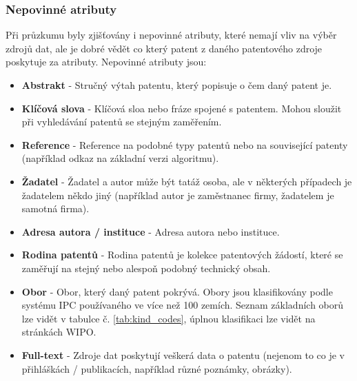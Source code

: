 \subsubsection{Nepovinné atributy}
Při průzkumu byly zjišťovány i nepovinné atributy, které nemají vliv na výběr zdrojů dat, ale je dobré vědět co který patent z daného patentového zdroje poskytuje za atributy. Nepovinné atributy jsou:
\begin{itemize}
\item \textbf{Abstrakt} - Stručný výtah patentu, který popisuje o čem daný patent je.
\item \textbf{Klíčová slova} - Klíčová sloa nebo fráze spojené s patentem. Mohou sloužit při vyhledávání patentů se stejným zaměřením.
\item \textbf{Reference} - Reference na podobné typy patentů nebo na související patenty (například odkaz na základní verzi algoritmu).
\item \textbf{Žadatel} - Žadatel a autor může být tatáž osoba, ale v některých případech je žadatelem někdo jiný (například autor je zaměstnanec firmy, žadatelem je samotná firma).
\item \textbf{Adresa autora / instituce} - Adresa autora nebo instituce.
\item \textbf{Rodina patentů} - Rodina patentů je kolekce patentových žádostí, které se zaměřují na stejný nebo alespoň podobný technický obsah.
\item \textbf{Obor} - Obor, který daný patent pokrývá. Obory jsou klasifikovány podle systému \gls{IPC} používaného ve více než 100 zemích. Seznam základních oborů lze vidět v tabulce č. \ref{tab:kind_codes}, úplnou klasifikaci lze vidět na stránkách \gls{WIPO}.
\item \textbf{Full-text} - Zdroje dat poskytují veškerá data o patentu (nejenom to co je v přihláškách / publikacích, například různé poznámky, obrázky).
\end{itemize}

